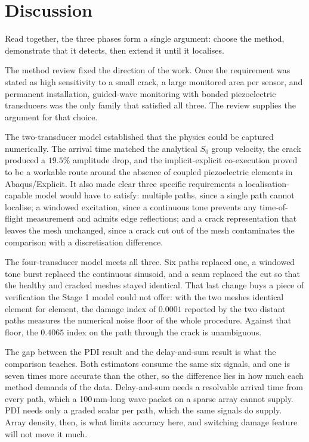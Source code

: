 \section{Discussion}

Read together, the three phases form a single argument: choose the method, demonstrate that it detects,
then extend it until it localises.

The method review fixed the direction of the work. Once the requirement was stated as high sensitivity to a
small crack, a large monitored area per sensor, and permanent installation, guided-wave monitoring with
bonded piezoelectric transducers was the only family that satisfied all three. The review supplies the
argument for that choice.

The two-transducer model established that the physics could be captured numerically. The arrival time
matched the analytical $S_{0}$ group velocity, the crack produced a $19.5\%$ amplitude drop, and the
implicit-explicit co-execution proved to be a workable route around the absence of coupled piezoelectric
elements in Abaqus/Explicit. It also made clear three specific requirements a localisation-capable model
would have to satisfy: multiple paths, since a single path cannot localise; a windowed excitation, since a
continuous tone prevents any time-of-flight measurement and admits edge reflections; and a crack
representation that leaves the mesh unchanged, since a crack cut out of the mesh contaminates the
comparison with a discretisation difference.

The four-transducer model meets all three. Six paths replaced one, a windowed tone burst replaced the
continuous sinusoid, and a seam replaced the cut so that the healthy and cracked meshes stayed identical.
That last change buys a piece of verification the Stage 1 model could not offer: with the two meshes identical
element for element, the damage index of $0.0001$ reported by the two distant paths measures the numerical
noise floor of the whole procedure. Against that floor, the $0.4065$ index on the path through the crack is
unambiguous.

The gap between the PDI result and the delay-and-sum result is what the comparison teaches. Both estimators
consume the same six signals, and one is seven times more accurate than the other, so the difference lies in
how much each method demands of the data. Delay-and-sum needs a resolvable arrival time from every path,
which a 100\,mm-long wave packet on a sparse array cannot supply. PDI needs only a graded scalar per path,
which the same signals do supply. Array density, then, is what limits accuracy here, and switching damage
feature will not move it much.

